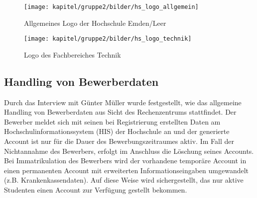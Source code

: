 \begin{figure}[h!]
	\centering
	\texttt{[image: kapitel/gruppe2/bilder/hs\_logo\_allgemein]}
	\caption{Allgemeines Logo der Hochschule Emden/Leer}
	\label{fig_logo_allgemein}
\end{figure}

\begin{figure}[h!]
	\centering
	\texttt{[image: kapitel/gruppe2/bilder/hs\_logo\_technik]}
	\caption{Logo des Fachbereiches Technik}
	\label{fig_logo_fb_technik}
\end{figure}

\subsection{Handling von Bewerberdaten}
Durch das Interview mit Günter Müller wurde festgestellt, wie das allgemeine Handling von Bewerberdaten aus Sicht des Rechenzentrums stattfindet. 
Der Bewerber meldet sich mit seinen bei Registrierung erstellten Daten am Hochschulinformationssystem (HIS) der Hochschule an und der generierte Account ist nur für die Dauer des Bewerbungszeitraumes aktiv. Im Fall der Nichtannahme des Bewerbers, erfolgt im Anschluss die Löschung seines Accounts. Bei Immatrikulation des Bewerbers wird der vorhandene temporäre Account in einen permanenten Account mit erweiterten Informationseingaben umgewandelt (z.B. Krankenkassendaten). Auf diese Weise wird sichergestellt, das nur aktive Studenten einen Account zur Verfügung gestellt bekommen. 